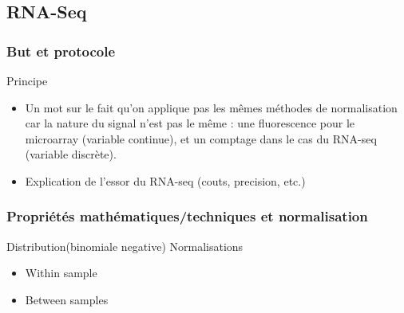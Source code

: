 \subsection{RNA-Seq}

\subsubsection{But et protocole}

Principe
\begin{itemize}
\item Un mot sur le fait qu'on applique pas les mêmes méthodes de normalisation car la nature du signal n'est pas le même : une fluorescence pour le microarray (variable continue), et un comptage dans le cas du RNA-seq (variable discrète).
\item Explication de l'essor du RNA-seq (couts, precision, etc.)
\end{itemize}

\subsubsection{Propriétés mathématiques/techniques et normalisation}
\label{subsubsection:rnaseq_props_and_normalisation}

Distribution(binomiale negative) %
Normalisations%
\begin{itemize}
    \item Within sample
    \item Between samples
\end{itemize}





